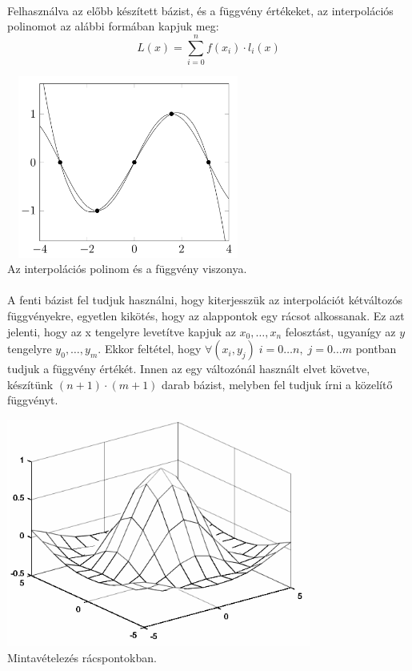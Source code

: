 \documentclass[12pt]{report}
\begin{document}
\paragraph{}
Felhasználva az előbb készített bázist, és a függvény értékeket, az interpolációs polinomot az alábbi formában kapjuk meg:$$L(x) = \sum_{i=0}^{n} f(x_i) \cdot l_i(x)$$
\begin{center}
\includegraphics[width=8cm,height=6cm]{pics/polynomial_interpolation}\\
{\footnotesize Az interpolációs polinom és a függvény viszonya.}
\end{center}
\paragraph{}
A fenti bázist fel tudjuk használni, hogy kiterjesszük az interpolációt kétváltozós függvényekre, egyetlen kikötés, hogy az alappontok egy rácsot alkossanak. Ez azt jelenti, hogy az x tengelyre levetítve kapjuk az $x_0, \dots, x_n$ felosztást, ugyanígy az $y$ tengelyre $y_0, \dots, y_m$. Ekkor feltétel, hogy $\forall (x_i, y_j) \; i = 0 \dots n, \; j = 0 \dots m$ pontban tudjuk a függvény értékét. Innen az egy változónál használt elvet követve, készítünk $(n+1) \cdot (m+1)$ darab bázist, melyben fel tudjuk írni a közelítő függvényt.
\begin{center}
\includegraphics[width=10cm]{pics/bivariable_grid}\\
{\footnotesize Mintavételezés rácspontokban.}
\end{center}
\end{document}
